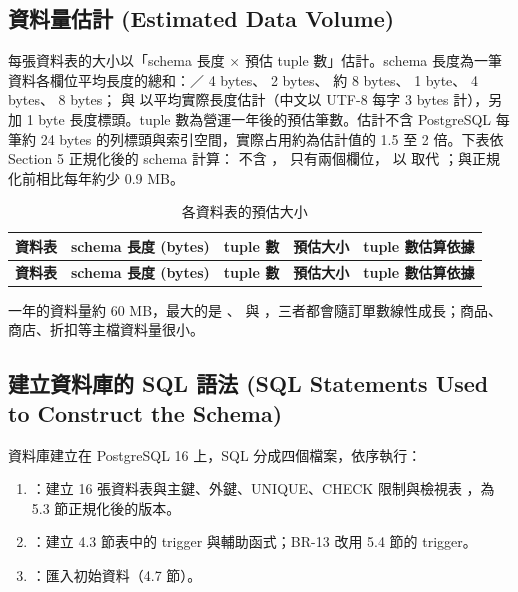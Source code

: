 \subsection{資料量估計 (Estimated Data Volume)}

每張資料表的大小以「schema 長度 × 預估 tuple 數」估計。schema 長度為一筆資料各欄位平均長度的總和：／ 4 bytes、 2 bytes、 約 8 bytes、 1 byte、 4 bytes、 8 bytes； 與  以平均實際長度估計（中文以 UTF-8 每字 3 bytes 計），另加 1 byte 長度標頭。tuple 數為營運一年後的預估筆數。估計不含 PostgreSQL 每筆約 24 bytes 的列標頭與索引空間，實際占用約為估計值的 1.5 至 2 倍。下表依 Section 5 正規化後的 schema 計算： 不含 ， 只有兩個欄位， 以  取代 ；與正規化前相比每年約少 0.9 MB。

\begingroup\small
\begin{xltabular}{\linewidth}{|>{\raggedright\arraybackslash}p{3.3cm}|>{\raggedleft\arraybackslash}p{1.9cm}|>{\raggedleft\arraybackslash}p{1.8cm}|>{\raggedleft\arraybackslash}p{1.9cm}|>{\raggedright\arraybackslash}X|}
\caption{各資料表的預估大小}\\
\hline{}\textbf{資料表} & \textbf{schema 長度 (bytes)} & \textbf{tuple 數} & \textbf{預估大小} & \textbf{tuple 數估算依據}\\\hline\endfirsthead
\hline{}\textbf{資料表} & \textbf{schema 長度 (bytes)} & \textbf{tuple 數} & \textbf{預估大小} & \textbf{tuple 數估算依據}\\\hline\endhead

\end{xltabular}
\endgroup

一年的資料量約 60 MB，最大的是 、 與 ，三者都會隨訂單數線性成長；商品、商店、折扣等主檔資料量很小。

\clearpage
\subsection{建立資料庫的 SQL 語法 (SQL Statements Used to Construct the Schema)}

資料庫建立在 PostgreSQL 16 上，SQL 分成四個檔案，依序執行：

\begin{enumerate}[itemsep=0.2em]
  \item {}：建立 16 張資料表與主鍵、外鍵、UNIQUE、CHECK 限制與檢視表 ，為 5.3 節正規化後的版本。
  \item {}：建立 4.3 節表中的 trigger 與輔助函式；BR-13 改用 5.4 節的 trigger。
  \item {}：匯入初始資料（4.7 節）。
\end{enumerate}

